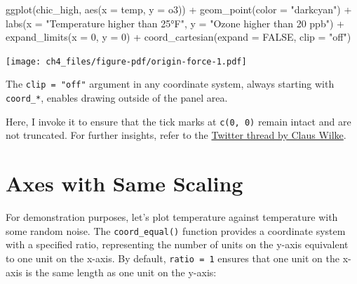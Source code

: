 \documentclass[
  letterpaper,
]{scrbook}
\newenvironment{Shaded}{\begin{snugshade}}{\end{snugshade}}
\newcommand{\AttributeTok}[1]{\textcolor[rgb]{0.40,0.45,0.13}{#1}}
\newcommand{\ConstantTok}[1]{\textcolor[rgb]{0.56,0.35,0.01}{#1}}
\newcommand{\DecValTok}[1]{\textcolor[rgb]{0.68,0.00,0.00}{#1}}
\newcommand{\FunctionTok}[1]{\textcolor[rgb]{0.28,0.35,0.67}{#1}}
\newcommand{\NormalTok}[1]{\textcolor[rgb]{0.00,0.23,0.31}{#1}}
\newcommand{\SpecialCharTok}[1]{\textcolor[rgb]{0.37,0.37,0.37}{#1}}
\newcommand{\StringTok}[1]{\textcolor[rgb]{0.13,0.47,0.30}{#1}}
\begin{document}
\begin{Shaded}
\begin{Highlighting}[]
\FunctionTok{ggplot}\NormalTok{(chic\_high, }\FunctionTok{aes}\NormalTok{(}\AttributeTok{x =}\NormalTok{ temp, }\AttributeTok{y =}\NormalTok{ o3)) }\SpecialCharTok{+}
  \FunctionTok{geom\_point}\NormalTok{(}\AttributeTok{color =} \StringTok{"darkcyan"}\NormalTok{) }\SpecialCharTok{+}
  \FunctionTok{labs}\NormalTok{(}\AttributeTok{x =} \StringTok{"Temperature higher than 25°F"}\NormalTok{,}
       \AttributeTok{y =} \StringTok{"Ozone higher than 20 ppb"}\NormalTok{) }\SpecialCharTok{+}
  \FunctionTok{expand\_limits}\NormalTok{(}\AttributeTok{x =} \DecValTok{0}\NormalTok{, }\AttributeTok{y =} \DecValTok{0}\NormalTok{) }\SpecialCharTok{+}
  \FunctionTok{coord\_cartesian}\NormalTok{(}\AttributeTok{expand =} \ConstantTok{FALSE}\NormalTok{, }\AttributeTok{clip =} \StringTok{"off"}\NormalTok{)}
\end{Highlighting}
\end{Shaded}

\texttt{[image: ch4\_files/figure-pdf/origin-force-1.pdf]}

\begin{tcolorbox}[enhanced jigsaw, toprule=.15mm, bottomtitle=1mm, coltitle=black, breakable, colbacktitle=quarto-callout-tip-color!10!white, opacityback=0, toptitle=1mm, colframe=quarto-callout-tip-color-frame, titlerule=0mm, title=\textcolor{quarto-callout-tip-color}{\faLightbulb}\hspace{0.5em}{Tip}, bottomrule=.15mm, arc=.35mm, opacitybacktitle=0.6, leftrule=.75mm, left=2mm, rightrule=.15mm, colback=white]

The \texttt{clip\ =\ "off"} argument in any coordinate system, always
starting with \texttt{coord\_*}, enables drawing outside of the panel
area.

\end{tcolorbox}

Here, I invoke it to ensure that the tick marks at \texttt{c(0,\ 0)}
remain intact and are not truncated. For further insights, refer to the
\href{https://twitter.com/clauswilke/status/991542952802619392?lang=en}{Twitter
thread by Claus Wilke}.

\section{Axes with Same Scaling}\label{axes-with-same-scaling}

For demonstration purposes, let's plot temperature against temperature
with some random noise. The \texttt{coord\_equal()} function provides a
coordinate system with a specified ratio, representing the number of
units on the y-axis equivalent to one unit on the x-axis. By default,
\texttt{ratio\ =\ 1} ensures that one unit on the x-axis is the same
length as one unit on the y-axis:
\end{document}

